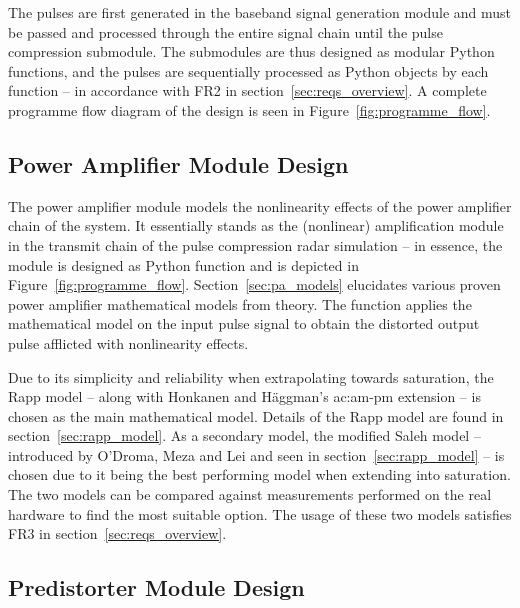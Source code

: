 The pulses are first generated in the baseband signal generation module and must be passed and processed through the entire signal chain until the pulse compression submodule. The submodules are thus designed as modular Python functions, and the pulses are sequentially processed as Python objects by each function -- in accordance with FR2 in section~\ref{sec:reqs_overview}. A complete programme flow diagram of the design is seen in Figure~\ref{fig:programme_flow}.

\subsection{Power Amplifier Module Design}\label{sec:power_amp_design}

The power amplifier module models the nonlinearity effects of the power amplifier chain of the system. It essentially stands as the (nonlinear) amplification module in the transmit chain of the pulse compression radar simulation -- in essence, the module is designed as Python function and is depicted in Figure~\ref{fig:programme_flow}. Section~\ref{sec:pa_models} elucidates various proven power amplifier mathematical models from theory. The function applies the mathematical model on the input pulse signal to obtain the distorted output pulse afflicted with nonlinearity effects. 

Due to its simplicity and reliability when extrapolating towards saturation, the Rapp model -- along with Honkanen and H\"aggman's \gls{ac:am-pm} extension -- is chosen as the main mathematical model. Details of the Rapp model are found in section~\ref{sec:rapp_model}. As a secondary model, the modified Saleh model -- introduced by O'Droma, Meza and Lei and seen in section~\ref{sec:rapp_model} -- is chosen due to it being the best performing model when extending into saturation. The two models can be compared against measurements performed on the real hardware to find the most suitable option. The usage of these two models satisfies FR3 in section~\ref{sec:reqs_overview}.

\subsection{Predistorter Module Design}\label{sec:predistorter_design}

